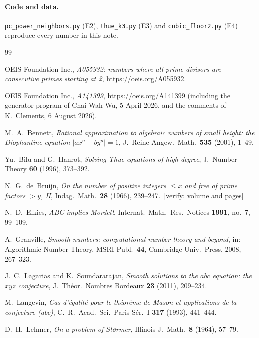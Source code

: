 \documentclass[11pt]{article}
\theoremstyle{definition}
\theoremstyle{remark}
\newcommand{\verify}[1]{{\color{red!70!black}\,[verify: #1]}}
\begin{document}
\paragraph{Code and data.} \texttt{pc\_power\_neighbors.py} (E2),
\texttt{thue\_k3.py} (E3) and \texttt{cubic\_floor2.py} (E4) reproduce every
number in this note.

\begin{thebibliography}{99}

 OEIS Foundation Inc., \emph{A055932: numbers where all prime
divisors are consecutive primes starting at 2},
\url{https://oeis.org/A055932}.

 OEIS Foundation Inc., \emph{A141399},
\url{https://oeis.org/A141399} (including the generator program of Chai Wah Wu,
5 April 2026, and the comments of K.~Clements, 6 August 2026).

 M.~A.~Bennett, \emph{Rational approximation to algebraic
numbers of small height: the Diophantine equation $|ax^n-by^n|=1$}, J.\ Reine
Angew.\ Math.\ \textbf{535} (2001), 1--49.

 Yu.~Bilu and G.~Hanrot, \emph{Solving Thue equations of
high degree}, J.\ Number Theory \textbf{60} (1996), 373--392.

 N.~G.~de~Bruijn, \emph{On the number of positive integers
$\le x$ and free of prime factors $>y$, II}, Indag.\ Math.\ \textbf{28} (1966),
239--247. \verify{volume and pages}

 N.~D.~Elkies, \emph{ABC implies Mordell}, Internat.\ Math.\
Res.\ Notices \textbf{1991}, no.~7, 99--109.

 A.~Granville, \emph{Smooth numbers: computational number
theory and beyond}, in: Algorithmic Number Theory, MSRI Publ.\ \textbf{44},
Cambridge Univ.\ Press, 2008, 267--323.

 J.~C.~Lagarias and K.~Soundararajan, \emph{Smooth solutions to the
$abc$ equation: the $xyz$ conjecture}, J.\ Th\'eor.\ Nombres Bordeaux
\textbf{23} (2011), 209--234.

 M.~Langevin, \emph{Cas d'\'egalit\'e pour le th\'eor\`eme de
Mason et applications de la conjecture (abc)}, C.\ R.\ Acad.\ Sci.\ Paris
S\'er.\ I \textbf{317} (1993), 441--444.

 D.~H.~Lehmer, \emph{On a problem of St{\o}rmer}, Illinois J.\
Math.\ \textbf{8} (1964), 57--79.


\end{thebibliography}
\end{document}

